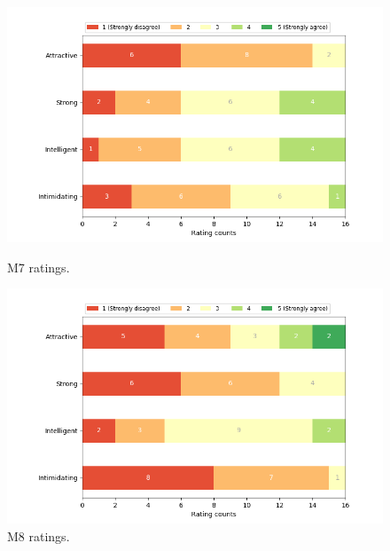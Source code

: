 \begin{figure}[H]
  \includegraphics[width=\linewidth]{Survey/MRatings/avatar_m7.png}
  \caption{M7 ratings.}
\endminipage\hfill
{}
  \includegraphics[width=\linewidth]{Survey/MRatings/avatar_m8.png}
  \caption{M8 ratings.}
\endminipage\hfill
\end{figure}
